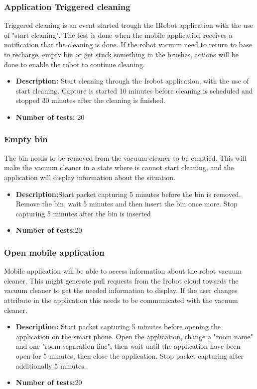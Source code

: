 \subsubsection{Application Triggered cleaning}
Triggered cleaning is an event started trough the IRobot application with the use of "start cleaning". The test is done when the mobile application receives a notification that the cleaning is done. If the robot vacuum need to return to base to recharge, empty bin or get stuck something in the brushes, actions will be done to enable the robot to continue cleaning. 
\begin{itemize}
    \item \textbf{Description:} Start cleaning through the Irobot application, with the use of start cleaning. Capture is started 10 minutes before cleaning is scheduled and stopped 30 minutes after the cleaning is finished. 
    \item \textbf{Number of tests:} 20
\end{itemize}

\subsubsection{Empty bin} The bin needs to be removed from the vacuum cleaner to be emptied. This will make the vacuum cleaner in a state where is cannot start cleaning, and the application will display information about the situation. 

\begin{itemize}
    \item \textbf{Description:}Start packet capturing 5 minutes before the bin is removed. Remove the bin, wait 5 minutes and then insert the bin once more. Stop capturing 5 minutes after the bin is inserted
    \item \textbf{Number of tests:}20
\end{itemize}

\subsubsection{Open mobile application}
Mobile application will be able to access information about the robot vacuum cleaner. This might generate pull requests from the Irobot cloud towards the vacuum cleaner to get the needed information to display. If the user changes attribute in the application this needs to be communicated with the vacuum cleaner. 
\begin{itemize}
    \item \textbf{Description:} Start packet capturing 5 minutes before opening the application on the smart phone. Open the application, change a "room name" and one "room separation line", then wait until the application have been open for 5 minutes, then close the application. Stop packet capturing after additionally 5 minutes. 
    \item \textbf{Number of tests:}20
\end{itemize}


